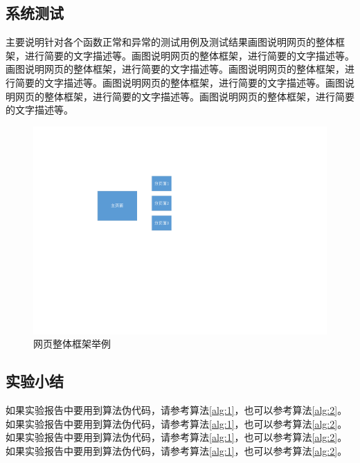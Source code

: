 \documentclass[supercite]{HustGraduPaper}
\theoremstyle{definition}
\begin{document}
    \subsection{系统测试}

    主要说明针对各个函数正常和异常的测试用例及测试结果画图说明网页的整体框架，进行简要的文字描述等。画图说明网页的整体框架，进行简要的文字描述等。画图说明网页的整体框架，进行简要的文字描述等。画图说明网页的整体框架，进行简要的文字描述等。画图说明网页的整体框架，进行简要的文字描述等。画图说明网页的整体框架，进行简要的文字描述等。画图说明网页的整体框架，进行简要的文字描述等。

    \begin{figure}[htb] %
        \begin{center}
            \includegraphics[scale=0.80]{images/1-1.pdf}
            \caption{网页整体框架举例}
            \label{fig3-1}
        \end{center}
    \end{figure}

    \subsection{实验小结}

    如果实验报告中要用到算法伪代码，请参考算法\ref{alg:1}，也可以参考算法\ref{alg:2}。如果实验报告中要用到算法伪代码，请参考算法\ref{alg:1}，也可以参考算法\ref{alg:2}。如果实验报告中要用到算法伪代码，请参考算法\ref{alg:1}，也可以参考算法\ref{alg:2}。如果实验报告中要用到算法伪代码，请参考算法\ref{alg:1}，也可以参考算法\ref{alg:2}。
\end{document}

